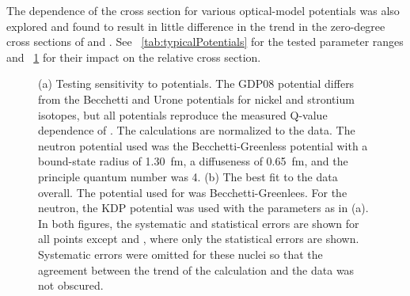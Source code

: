  The dependence of the cross section for various  optical-model potentials was also explored and found to result in little difference in the trend in the zero-degree cross sections of  and .  See {\tab}~\ref{tab:typicalPotentials} for the tested parameter ranges and {\fig}~\ref{fig:parameterSensitivity} for their impact on the relative cross section.

\begin{figure}[!htbp]
\centering
{}
\caption[Sensitivity of trends in zero-degree cross sections to  optical model parameters.]{(a) Testing sensitivity to  potentials.  The GDP08 potential differs from the Becchetti and Urone potentials for nickel and strontium isotopes, but all potentials reproduce the measured Q-value dependence of \GeTargets.  The calculations are normalized to the  data.  The neutron potential used was the Becchetti-Greenless potential with a bound-state radius of 1.30~fm, a diffuseness of 0.65~fm, and the principle quantum number was 4.  (b) The best fit to the data overall.  The potential used for  was Becchetti-Greenlees.  For the neutron, the KDP potential was used with the parameters as in (a).  In both figures, the systematic and statistical errors are shown for all points except  and , where only the statistical errors are shown.  Systematic errors were omitted for these nuclei so that the agreement between the trend of the calculation and the data was not obscured.}
\label{fig:parameterSensitivity}
\end{figure}

